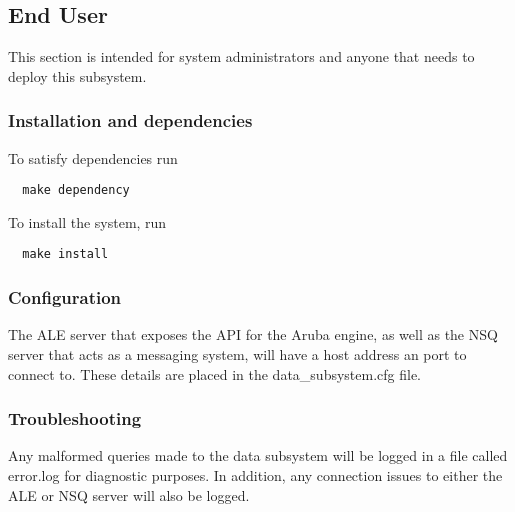 \subsection{End User}
This section is intended for system administrators and anyone that needs to deploy this subsystem.
\subsubsection{Installation and dependencies}
To satisfy dependencies run
\begin{verbatim}
  make dependency
\end{verbatim}
To install the system, run
\begin{verbatim}
  make install
\end{verbatim}
\subsubsection{Configuration}
The ALE server that exposes the API for the Aruba engine, as well as the NSQ server that acts as a messaging system, will have a host address an port to connect to. These details are placed in the data_subsystem.cfg file.
\subsubsection{Troubleshooting}
Any malformed queries made to the data subsystem will be logged in a file called error.log for diagnostic purposes. In addition, any connection issues to either the ALE or NSQ server will also be logged.

